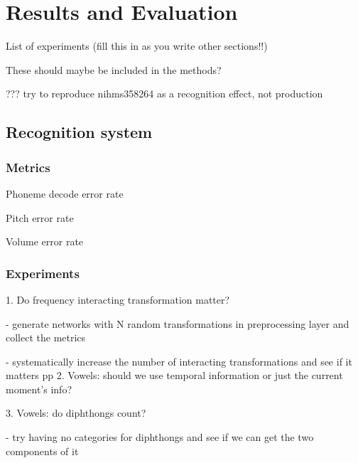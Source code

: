 \chapter{Results and Evaluation}




List of experiments (fill this in as you write other sections!!)

These should maybe be included in the methods?

??? try to reproduce nihms358264 as a recognition effect, not production

\section{Recognition system}

\subsection{Metrics}

Phoneme decode error rate

Pitch error rate

Volume error rate

\subsection{Experiments}

1. Do frequency interacting transformation matter?

- generate networks with N random transformations
  in preprocessing layer and collect the metrics

- systematically increase the number of interacting
  transformations and see if it matters
pp
2. Vowels: should we use temporal information or just
   the current moment's info?

3. Vowels: do diphthongs count?

- try having no categories for diphthongs and see if
  we can get the two components of it

